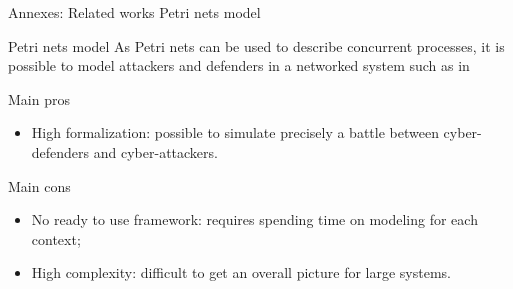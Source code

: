 	\begin{frame}{Annexes: Related works}
		{Petri nets model}

            \begin{block}{Petri nets model}
                As Petri nets can be used to describe concurrent processes, it is possible to model attackers and defenders in a networked system such as in ~\cite{SYamaguchi2020}
            \end{block}

            \begin{prosblock}{Main pros}
                \begin{itemize}
                    \item High formalization: possible to simulate precisely a battle between cyber-defenders and cyber-attackers. 
                \end{itemize}
            \end{prosblock}

            \begin{consblock}{Main cons}
                \begin{itemize}
                    \item No ready to use framework: requires spending time on modeling for each context;
                    \item High complexity: difficult to get an overall picture for large systems.
                \end{itemize}
            \end{consblock}

	\end{frame}

